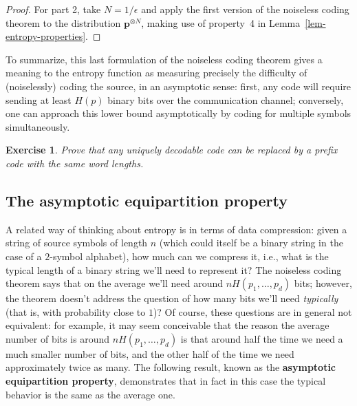 \documentclass[12pt]{article}
\newtheorem{exercise}[thm]{Exercise}
\theoremstyle{example}
\begin{document}
\begin{proof} For part 2, take $N=1/\epsilon$ and apply the first version of the noiseless coding theorem to the distribution $\mathbf{p}^{\otimes N}$, making use of property~4 in Lemma~\ref{lem-entropy-properties}.
\end{proof}

To summarize, this last formulation of the noiseless coding theorem gives a meaning to the entropy function as measuring precisely the difficulty of (noiselessly) coding the source, in an asymptotic sense: first, any code will require sending at least $H(p)$ binary bits over the communication channel; conversely, one can approach this lower bound asymptotically by coding for multiple symbols simultaneously.

\begin{exercise}
\label{exer-uniquely-decodable}
Prove that any uniquely decodable code can be replaced by a prefix code with the same word lengths.
\end{exercise}


\subsection{The asymptotic equipartition property}

A related way of thinking about entropy is in terms of data compression: given a string of source symbols of length $n$ (which could itself be a binary string in the case of a $2$-symbol alphabet), how much can we compress it, i.e., what is the typical length of a binary string we'll need to represent it? The noiseless coding theorem says that on the average we'll need around $n H(p_1,\ldots,p_d)$ bits; however, the theorem doesn't address the question of how many bits we'll need \emph{typically} (that is, with probability close to $1$)? Of course, these questions are in general not equivalent: for example, it may seem conceivable that the reason the average number of bits is around $nH(p_1,\ldots,p_d)$ is that around half the time we need a much smaller number of bits, and the other half of the time we need approximately twice as many. The following result, known as the \textbf{asymptotic equipartition property}, demonstrates that in fact in this case the typical behavior is the same as the average one.
\end{document}
